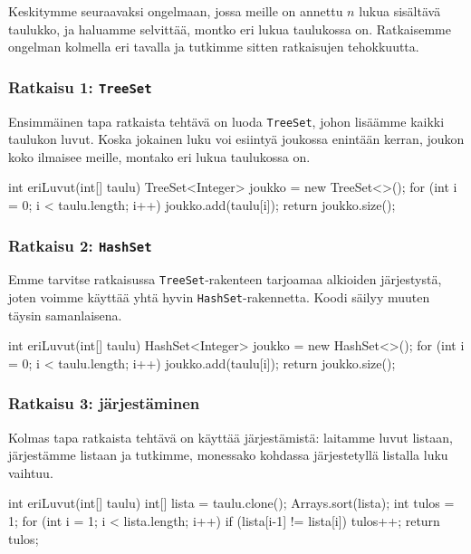 Keskitymme seuraavaksi ongelmaan, jossa meille on annettu
$n$ lukua sisältävä taulukko, ja haluamme selvittää,
montko eri lukua taulukossa on.
Ratkaisemme ongelman kolmella eri tavalla ja tutkimme sitten
ratkaisujen tehokkuutta.

\subsubsection{Ratkaisu 1: \texttt{TreeSet}}

Ensimmäinen tapa ratkaista tehtävä on luoda \texttt{TreeSet},
johon lisäämme kaikki taulukon luvut.
Koska jokainen luku voi esiintyä joukossa enintään kerran,
joukon koko ilmaisee meille, montako eri lukua taulukossa on.

\begin{code}
int eriLuvut(int[] taulu) {
    TreeSet<Integer> joukko = new TreeSet<>();
    for (int i = 0; i < taulu.length; i++) {
        joukko.add(taulu[i]);
    }
    return joukko.size();
}
\end{code}

\subsubsection{Ratkaisu 2: \texttt{HashSet}}

Emme tarvitse ratkaisussa \texttt{TreeSet}-rakenteen
tarjoamaa alkioiden järjestystä, joten voimme käyttää
yhtä hyvin \texttt{HashSet}-rakennetta.
Koodi säilyy muuten täysin samanlaisena.

\begin{code}
int eriLuvut(int[] taulu) {
    HashSet<Integer> joukko = new HashSet<>();
    for (int i = 0; i < taulu.length; i++) {
        joukko.add(taulu[i]);
    }
    return joukko.size();
}
\end{code}

\subsubsection{Ratkaisu 3: järjestäminen}

Kolmas tapa ratkaista tehtävä on käyttää järjestämistä:
laitamme luvut listaan, järjestämme listaan ja
tutkimme, monessako kohdassa järjestetyllä listalla
luku vaihtuu.

\begin{code}
int eriLuvut(int[] taulu) {
    int[] lista = taulu.clone();
    Arrays.sort(lista);
    int tulos = 1;
    for (int i = 1; i < lista.length; i++) {
        if (lista[i-1] != lista[i]) tulos++;
    }
    return tulos;
}
\end{code}

